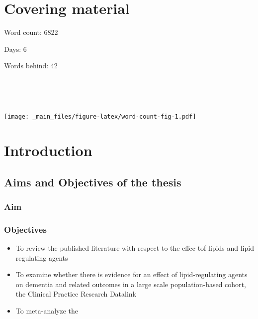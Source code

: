 \documentclass[a4paper, twoside]{templates/ociamthesis}
\providecommand{\tightlist}{%
  \setlength{\itemsep}{0pt}\setlength{\parskip}{0pt}}
\begin{document}
\flushbottom

\hypertarget{covering-material}{%
\chapter*{Covering material}\label{covering-material}}

\adjustmtc

Word count: 6822

Days: 6

Words behind: 42

~

~

\texttt{[image: \_main\_files/figure-latex/word-count-fig-1.pdf]}

\hypertarget{intro-intro}{%
\chapter{Introduction}\label{intro-intro}}

\minitoc 

\hypertarget{aims-and-objectives-of-the-thesis}{%
\section{Aims and Objectives of the thesis}\label{aims-and-objectives-of-the-thesis}}

\hypertarget{aim}{%
\subsection{Aim}\label{aim}}

\hypertarget{objectives}{%
\subsection{Objectives}\label{objectives}}

\begin{itemize}
\tightlist
\item
  To review the published literature with respect to the effec tof lipids and lipid regulating agents\\
\item
  To examine whether there is evidence for an effect of lipid-regulating agents on dementia and related outcomes in a large scale population-based cohort, the Clinical Practice Research Datalink
\item
  To meta-analyze the
\end{itemize}
\end{document}

